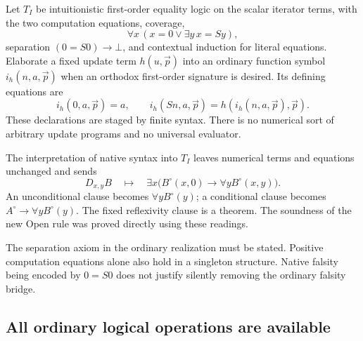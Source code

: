 \documentclass[11pt,letterpaper]{article}
\theoremstyle{definition}
\begin{document}
Let $T_I$ be intuitionistic first-order equality logic on the scalar
iterator terms, with the two computation equations, coverage,
\[
             \forall x\,(x=0\vee\exists y\,x=Sy),
\]
separation $(0=S0)\to\bot$, and contextual induction for literal
equations.  Elaborate a fixed update term $h(u,\vec p)$ into an ordinary
function symbol $i_h(n,a,\vec p)$ when an orthodox first-order signature is
desired.  Its defining equations are
\[
 i_h(0,a,\vec p)=a,\qquad
 i_h(Sn,a,\vec p)=h(i_h(n,a,\vec p),\vec p).
\]
These declarations are staged by finite syntax.  There is no numerical
sort of arbitrary update programs and no universal evaluator.

The interpretation of native syntax into $T_I$ leaves numerical terms and
equations unchanged and sends
\[
 D_{x,y}B\quad\mapsto\quad
 \exists x\bigl(B^\circ(x,0)\to\forall y B^\circ(x,y)\bigr).
\]
An unconditional clause becomes $\forall y B^\circ(y)$; a conditional
clause becomes $A^\circ\to\forall y B^\circ(y)$.  The fixed reflexivity
clause is a theorem.  The soundness of the new Open rule was proved directly
using these readings.

The separation axiom in the ordinary realization must be stated.  Positive
computation equations alone also hold in a singleton structure.  Native
falsity being encoded by $0=S0$ does not justify silently removing the
ordinary falsity bridge.

\subsection{All ordinary logical operations are available}
\end{document}
